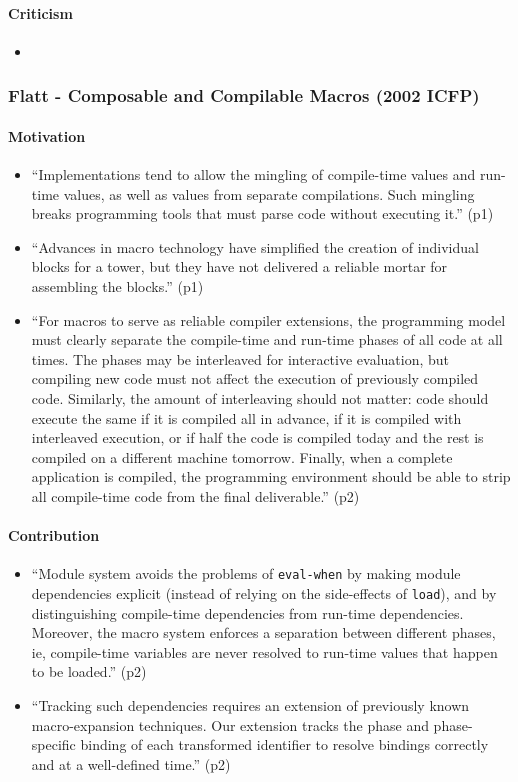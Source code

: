 \documentclass[12pt]{article}	%
\begin{document}
\paragraph{Criticism}
\begin{itemize}
	\item
\end{itemize}



\subsubsection*{Flatt - Composable and Compilable Macros (2002 ICFP)}
\paragraph{Motivation}
\begin{itemize}
	\item ``Implementations tend to allow the mingling of compile-time values and run-time values, as well as values from separate compilations. Such mingling breaks programming tools that must parse code without executing it.'' (p1)
	\item ``Advances in macro technology have simplified the creation of individual blocks for a tower, but they have not delivered a reliable mortar for assembling the blocks.'' (p1)
	\item ``For macros to serve as reliable compiler extensions, the programming model must clearly separate the compile-time and run-time phases of all code at all times. The phases may be interleaved for interactive evaluation, but compiling new code must not affect the execution of previously compiled code. Similarly, the amount of interleaving should not matter: code should execute the same if it is compiled all in advance, if it is compiled with interleaved execution, or if half the code is compiled today and the rest is compiled on a different machine tomorrow. Finally, when a complete application is compiled, the programming environment should be able to strip all compile-time code from the final deliverable.'' (p2)
\end{itemize}
\paragraph{Contribution}
\begin{itemize}
	\item ``Module system avoids the problems of \verb!eval-when! by making module dependencies explicit (instead of relying on the side-effects of \verb!load!), and by distinguishing compile-time dependencies from run-time dependencies. Moreover, the macro system enforces a separation between different phases, ie, compile-time variables are never resolved to run-time values that happen to be loaded.'' (p2)
	\item ``Tracking such dependencies requires an extension of previously known macro-expansion techniques. Our extension tracks the phase and phase-specific binding of each transformed identifier to resolve bindings correctly and at a well-defined time.'' (p2) 
\end{itemize}
\end{document}
